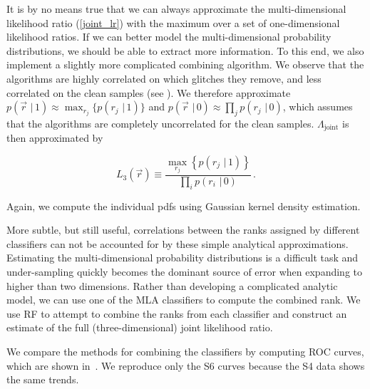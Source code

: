\documentclass[prd, twocolumn, lengthcheck, superscriptaddress, showpacs, letterpaper, nofootinbib]{revtex4-1}
\newcommand\given{\,\,|\,}
\newcommand\vecrank{\vec{r}}
\begin{document}
It is by no means true that we can always approximate the multi-dimensional likelihood ratio (\ref{joint_lr}) with the maximum over a set of one-dimensional likelihood ratios. If we can better model the multi-dimensional probability distributions, we should be able to extract more information. To this end, we also implement a slightly more complicated combining algorithm. We observe that the algorithms are highly correlated on which glitches they remove, and less correlated on the clean samples (see ). We therefore approximate $p(\vecrank \given 1) \approx \max_{r_j}\{p(r_j \given 1)\}$ and $p(\vecrank \given 0) \approx \prod_j p(r_j \given 0)$, which assumes that the algorithms are completely uncorrelated for the clean samples. $\Lambda_{\mathrm{joint}}$ is then approximated by

\begin{equation}
\label{randomcleanlr}
L_{3}(\vecrank) \equiv \frac{\max_{r_j} \left\{p(r_j \given 1)\right\}}{\prod_{i} p(r_i\given 0)}\,.
\end{equation} 

\noindent Again, we compute the individual \ac{pdf}s using Gaussian kernel density estimation.

More subtle, but still useful, correlations between the ranks assigned by different classifiers can not be accounted for by these simple analytical approximations. Estimating the multi-dimensional probability distributions is a difficult task and under-sampling quickly becomes the dominant source of error when expanding to higher than two dimensions. Rather than developing a complicated analytic model, we can use one of the \ac{MLA} classifiers to compute the combined rank. We use \ac{RF} to attempt to combine the ranks from each classifier and construct an estimate of the full (three-dimensional) joint likelihood ratio.

We compare the methods for combining the classifiers by computing \ac{ROC} curves, which are shown in~. We reproduce only the S6 curves because the S4 data shows the same trends. %
\end{document}
